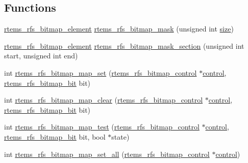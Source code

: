 \subsection*{Functions}
\begin{DoxyCompactItemize}
\item 
\mbox{\hyperlink{rtems-rfs-bitmaps_8h_a2e909e0a0c9759ac71ca69851253b905}{rtems\+\_\+rfs\+\_\+bitmap\+\_\+element}} \mbox{\hyperlink{rtems-rfs-bitmaps_8h_a6c6686287ba3caa0684a13233870c2ce}{rtems\+\_\+rfs\+\_\+bitmap\+\_\+mask}} (unsigned int \mbox{\hyperlink{sun4u_2tte_8h_a245260f6f74972558f61b85227df5aae}{size}})
\item 
\mbox{\hyperlink{rtems-rfs-bitmaps_8h_a2e909e0a0c9759ac71ca69851253b905}{rtems\+\_\+rfs\+\_\+bitmap\+\_\+element}} \mbox{\hyperlink{rtems-rfs-bitmaps_8h_ab7bd24e753558028374d00c06c99ded1}{rtems\+\_\+rfs\+\_\+bitmap\+\_\+mask\+\_\+section}} (unsigned int start, unsigned int end)
\item 
int \mbox{\hyperlink{rtems-rfs-bitmaps_8h_a36abb0e8f56bc9307bef555ec0f740be}{rtems\+\_\+rfs\+\_\+bitmap\+\_\+map\+\_\+set}} (\mbox{\hyperlink{rtems-rfs-bitmaps_8h_aa1b1de5abc294444428eb1038d7f898b}{rtems\+\_\+rfs\+\_\+bitmap\+\_\+control}} $\ast$\mbox{\hyperlink{structcontrol}{control}}, \mbox{\hyperlink{rtems-rfs-bitmaps_8h_acc1b0aefe1b090890ccbc1b05279a78e}{rtems\+\_\+rfs\+\_\+bitmap\+\_\+bit}} bit)
\item 
int \mbox{\hyperlink{rtems-rfs-bitmaps_8h_aa4bd94b56bf1969270c51b4534ad5677}{rtems\+\_\+rfs\+\_\+bitmap\+\_\+map\+\_\+clear}} (\mbox{\hyperlink{rtems-rfs-bitmaps_8h_aa1b1de5abc294444428eb1038d7f898b}{rtems\+\_\+rfs\+\_\+bitmap\+\_\+control}} $\ast$\mbox{\hyperlink{structcontrol}{control}}, \mbox{\hyperlink{rtems-rfs-bitmaps_8h_acc1b0aefe1b090890ccbc1b05279a78e}{rtems\+\_\+rfs\+\_\+bitmap\+\_\+bit}} bit)
\item 
int \mbox{\hyperlink{rtems-rfs-bitmaps_8h_abc6a4b7a3b0ef2602246517f9bb4e9a3}{rtems\+\_\+rfs\+\_\+bitmap\+\_\+map\+\_\+test}} (\mbox{\hyperlink{rtems-rfs-bitmaps_8h_aa1b1de5abc294444428eb1038d7f898b}{rtems\+\_\+rfs\+\_\+bitmap\+\_\+control}} $\ast$\mbox{\hyperlink{structcontrol}{control}}, \mbox{\hyperlink{rtems-rfs-bitmaps_8h_acc1b0aefe1b090890ccbc1b05279a78e}{rtems\+\_\+rfs\+\_\+bitmap\+\_\+bit}} bit, bool $\ast$state)
\item 
int \mbox{\hyperlink{rtems-rfs-bitmaps_8h_a88705115aae0a4ba16c754dc2be2ae6b}{rtems\+\_\+rfs\+\_\+bitmap\+\_\+map\+\_\+set\+\_\+all}} (\mbox{\hyperlink{rtems-rfs-bitmaps_8h_aa1b1de5abc294444428eb1038d7f898b}{rtems\+\_\+rfs\+\_\+bitmap\+\_\+control}} $\ast$\mbox{\hyperlink{structcontrol}{control}})

\end{DoxyCompactItemize}
